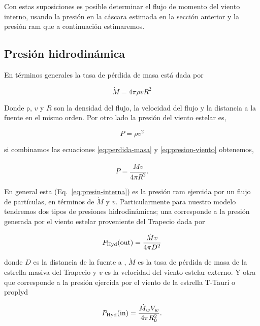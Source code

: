 Con estas suposiciones es posible determinar el flujo de momento del viento interno, usando la presión en la cáscara estimada en la sección anterior y la presión ram que a continuación estimaremos.  

\subsection{Presión hidrodinámica}
\label{sec:pressure}

 En términos generales la tasa de pérdida de masa está dada por

\begin{equation}
  \label{eq:perdida-masa}
  \dot{M}=4\pi \rho v R^{2}
\end{equation}

Donde \(\mathrm{\rho}\), \(v\) y \(R\) son la densidad del flujo, la velocidad del flujo y la distancia a la fuente en el mismo orden. Por otro lado la presión del viento estelar es,

\begin{equation}
  \label{eq:presion-viento}
  P=\rho v^{2}
\end{equation}

si combinamos las ecuaciones \ref{eq:perdida-masa} y \ref{eq:presion-viento} obtenemos,

\begin{equation}
  \label{eq:presin-interna}
  P=\frac{\dot{M} v}{4 \pi R^{2}}. 
\end{equation}
 
En general esta (Eq.~\ref{eq:presin-interna}) es la presión ram ejercida por un flujo de partículas, en términos de \(\dot{M}\) y \(v\). Particularmente para nuestro modelo tendremos  dos tipos de presiones hidrodinámicas; una corresponde a la presión generada por el viento estelar proveniente del Trapecio dada por

\begin{equation}
  \label{eq:presion-externa}
   P_{\text{Hyd}}(\mathrm{out}{})=\frac{\dot{M}v}{4 \pi D^{2}}
\end{equation}

donde \(D\) es la distancia de la fuente a \thC{}, \(\dot{M}\) es la tasa de pérdida de masa de la estrella masiva del Trapecio y \(v\) es la velocidad del viento estelar externo. Y otra que corresponde a la presión ejercida por el viento de la estrella T-Tauri o proplyd

 
\begin{equation}
  \label{eq:presion-interna}
  P_{\text{Hyd}}(\mathrm{in}{})=\frac{\dot{M}_{w} V_{w}}{4 \pi R_{0}^{2}}.
\end{equation}

